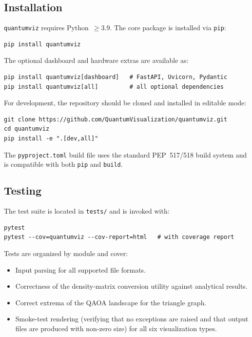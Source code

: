 \documentclass{SciPost}
\begin{document}
\subsection{Installation}

\texttt{quantumviz} requires Python~$\geq 3.9$.
The core package is installed via \texttt{pip}:
\begin{lstlisting}
pip install quantumviz
\end{lstlisting}

The optional dashboard and hardware extras are available as:
\begin{lstlisting}
pip install quantumviz[dashboard]   # FastAPI, Uvicorn, Pydantic
pip install quantumviz[all]         # all optional dependencies
\end{lstlisting}

For development, the repository should be cloned and installed in editable
mode:
\begin{lstlisting}
git clone https://github.com/QuantumVisualization/quantumviz.git
cd quantumviz
pip install -e ".[dev,all]"
\end{lstlisting}

The \texttt{pyproject.toml} build file uses the standard PEP~517/518 build
system and is compatible with both \texttt{pip} and \texttt{build}.

\subsection{Testing}

The test suite is located in \texttt{tests/} and is invoked with:
\begin{lstlisting}
pytest
pytest --cov=quantumviz --cov-report=html   # with coverage report
\end{lstlisting}

Tests are organized by module and cover:
\begin{itemize}
  \item Input parsing for all supported file formats.
  \item Correctness of the density-matrix conversion utility against
        analytical results.
  \item Correct extrema of the QAOA landscape for the triangle graph.
  \item Smoke-test rendering (verifying that no exceptions are raised and
        that output files are produced with non-zero size) for all six
        visualization types.
\end{itemize}
\end{document}
